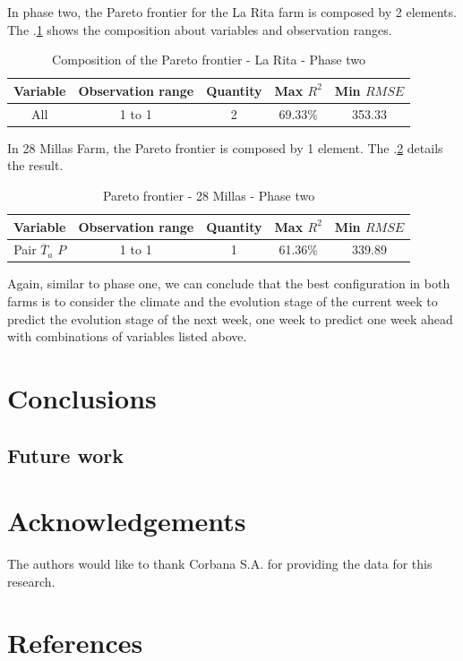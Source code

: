 \documentclass[review,authoryear,english]{elsarticle}
\begin{document}
In phase two, the Pareto frontier for the La Rita farm is composed by 2 elements. The \tablename $.$\ref{tabla4} shows the composition about variables and observation ranges.

\begin{table}[h] 
\caption{Composition of the Pareto frontier - La Rita - Phase two} 
\label{tabla4} 
\centering
\begin{tabular}{c|c|c|c|c} 
\hline
\bfseries Variable & \bfseries Observation range & \bfseries Quantity & \bfseries Max $R^2$ & \bfseries Min $RMSE$\\ 
\hline\hline 
All & 1 to 1  & 2 & 69.33\% & 353.33 \\
\hline
\end{tabular} 
\end{table}

In 28 Millas Farm, the Pareto frontier is composed by 1 element. The \tablename $.$\ref{tabla5} details the result.

\begin{table}[h] 
\caption{Pareto frontier - 28 Millas - Phase two} 
\label{tabla5} 
\centering
\begin{tabular}{c|c|c|c|c} 
\hline
\bfseries Variable & \bfseries Observation range & \bfseries Quantity & \bfseries Max $R^2$ & \bfseries Min $RMSE$\\ 
\hline\hline 
Pair $\overline{T}_{a}$ $P$ & 1 to 1 & 1 & 61.36\% & 339.89 \\
\hline
\end{tabular} 
\end{table}

Again, similar to phase one, we can conclude that the best configuration in both farms is to consider the climate and the evolution stage of the current week to predict the evolution stage of the next week, one week to predict one week ahead with combinations of variables listed above.

\section{Conclusions}
\label{sec:concl}

\subsection{Future work}

\section{Acknowledgements}

The authors would like to thank Corbana S.A. for providing the data for this research. 

\section{References}


\end{document}
